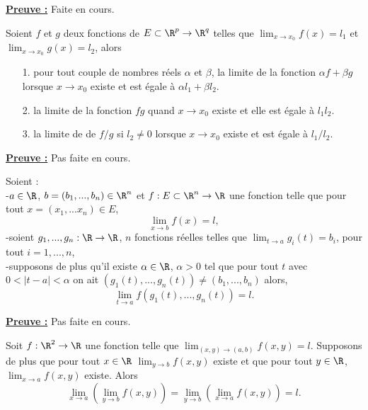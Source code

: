 \documentclass[class=report,crop=false]{standalone}
\begin{document}
\noindent \underline{\bf Preuve :}
Faite en cours.


 
 \begin{proposition}
\textcolor[rgb]{0.50,0.00,0.25}{
Soient $f$ et $g$ deux fonctions de $E\subset \R^p \rightarrow \R^q$ telles que 
$\displaystyle \lim_{x \rightarrow x_0} f(x)=l_1$ et $\displaystyle \lim_{x \rightarrow x_0} g(x)=l_2$, alors
\begin{itemize}
\item[1.] pour tout couple de nombres réels $\alpha$ et $\beta$, la limite de la fonction
$\alpha f +\beta g$ lorsque $x \rightarrow x_0$ existe et est égale à $\alpha l_1+\beta l_2$.
\item[2.] la limite de la fonction $fg$ quand $x \rightarrow x_0$ existe et elle est égale à $l_1l_2$.
\item[3.]la limite de de $f/g$  si $l_2 \neq 0$ lorsque  $x \rightarrow x_0$ existe et est égale 
à $l_1/l_2$.
\end{itemize}
}
\end{proposition}

\noindent \underline{\bf Preuve :}
Pas faite en cours.



 \begin{proposition}
\textcolor[rgb]{0.50,0.00,0.25}{
Soient :\\
-$a \in \R$, $b=(b_1, ..., b_n) \in \R^n$ et $f:E \subset \R^n \rightarrow \R$ une fonction telle que pour tout $x=(x_1,...x_n) \in  E$,
\begin{equation*}
\displaystyle \lim_{x\rightarrow b} f(x)=l,
\end{equation*}
-soient 
$g_1,... ,g_n: \R \rightarrow \R$, $n$ fonctions  réelles telles que  $\displaystyle \lim_{t \rightarrow a} g_i(t)=b_i$, pour tout $i=1,..., n$, \\
-supposons de plus qu'il existe $\alpha \in  \R$, $\alpha >0$
tel que pour tout $t$ avec $0<\vert t- a \vert < \alpha$ on ait $(g_1(t), ..., g_n(t)) \neq (b_1, ..., b_n)$
alors,
\begin{equation*}
 \displaystyle \lim_{t \rightarrow a} f(g_1(t), ..., g_n(t))=l.
\end{equation*} 
}
\end{proposition}


\noindent \underline{\bf Preuve :}
Pas faite en cours.



 \begin{proposition}
\textcolor[rgb]{0.50,0.00,0.25}{
Soit $f:\R^2 \rightarrow \R$ une fonction telle que $\displaystyle \lim_{(x,y) \rightarrow (a,b)} f(x,y)=l$.
Supposons de plus que pour tout $x \in \R$ $\displaystyle \lim_{y\rightarrow b} f(x,y)$ existe et que 
pour tout $y \in \R$, $\displaystyle \lim_{x\rightarrow a} f(x,y)$ existe. Alors
\begin{equation*}
\displaystyle \lim_{x \rightarrow a} (\displaystyle \lim_{y \rightarrow b} f(x,y))=\displaystyle \lim_{y \rightarrow b} (\displaystyle \lim_{x \rightarrow a} f(x,y))=l.
\end{equation*}
}
\end{proposition}
\end{document}
